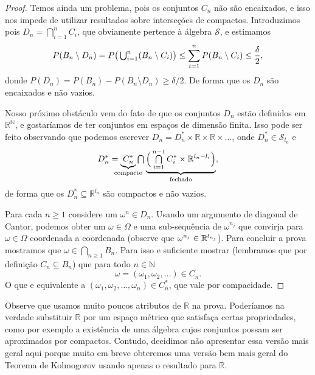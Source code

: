 \begin{proof}
  Temos ainda um problema, pois os conjuntos $C_n$ não são encaixados, e isso nos impede de utilizar resultados sobre interseções de compactos.
  Introduzimos pois $D_n = \bigcap_{i=1}^n C_i$, que obviamente pertence à álgebra $\mathcal{S}$, e estimamos
  \begin{equation}
    P(B_n \setminus D_n) = P \big( \operatorname*{{\textstyle \bigcup}}\nolimits_{i=1}^n (B_n \setminus C_i) \big) \leq \sum_{i=1}^n P(B_n \setminus C_i) \leq \frac{\delta}2,
  \end{equation}
  donde $P(D_n) = P(B_n) - P(B_n \setminus D_n) \geq \delta/2$.
  De forma que os $D_n$ são encaixados e não vazios.

  Nosso próximo obstáculo vem do fato de que os conjuntos $D_n$ estão definidos em $\mathbb{R}^\mathbb{N}$, e gostaríamos de ter conjuntos em espaços de dimensão finita.
  Isso pode ser feito observando que podemos escrever $D_n = D_n^* \times \mathbb{R} \times \mathbb{R} \times \dots$, onde $D_n^* \in \mathcal{S}_{l_n}$ e
  \begin{equation}
    D_n^* = \underbrace{C_n^*}_{\mathclap{\text{compacto}}} \mcap \underbrace{ \Big( \mcap_{i=1}^{n-1} C_i^* \times \mathbb{R}^{l_n - l_i} \Big)}_{\text{fechado}},
  \end{equation}
  de forma que os $D_n^* \subseteq \mathbb{R}^{l_n}$ são compactos  e não vazios.

  Para cada $n \geq 1$ considere um $\omega^n \in D_n$.
  Usando um argumento de diagonal de Cantor, podemos obter um $\omega \in \Omega$
  e uma sub-sequência de $\omega^{n_j}$ que convirja para $\omega \in \Omega$ coordenada a coordenada
  (observe que $\omega^{n_j} \in \mathbb{R}^{\smash{l_{n_j}}}$).  %
 Para concluir a prova mostramos que $\omega \in \bigcap_{n\ge 1} B_n$.
 Para isso e suficiente mostrar (lembramos que por definição $C_n \subseteq B_n$) que para todo $n\in \mathbb{N}$
  \begin{equation*}
\omega = (\omega_1, \omega_2, \dots) \in C_n.
  \end{equation*}
  O que e equivalente a $(\omega_1, \omega_2, \dots, \omega_n) \in C^*_n$, que vale por compacidade.
\end{proof}

Observe que usamos muito poucos atributos de $\mathbb{R}$ na prova.
Poderíamos na verdade substituir $\mathbb{R}$ por um espaço métrico que satisfaça certas propriedades, como por exemplo a existência de uma álgebra cujos conjuntos possam ser aproximados por compactos.
Contudo, decidimos não apresentar essa versão mais geral aqui porque muito em breve obteremos uma versão bem mais geral do Teorema de Kolmogorov usando apenas o resultado para $\mathbb{R}$.


